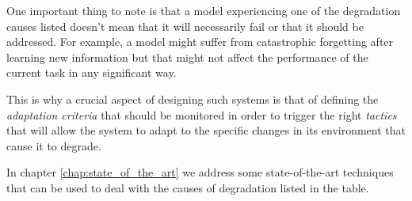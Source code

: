 \documentclass[../main.tex]{subfiles}
\begin{document}

    One important thing to note is that a model experiencing one of the degradation causes listed doesn't mean that it will necessarily fail or that it should be addressed. For example, a model might suffer from catastrophic forgetting after learning new information but that might not affect the performance of the current task in any significant way.
    
    This is why a crucial aspect of designing such systems is that of defining the \textit{adaptation criteria} that should be monitored in order to trigger the right \textit{tactics} that will allow the system to adapt to the specific changes in its environment that cause it to degrade.
    

    In chapter \ref{chap:state_of_the_art} we address some state-of-the-art techniques that can be used to deal with the causes of degradation listed in the table. 
\end{document}
